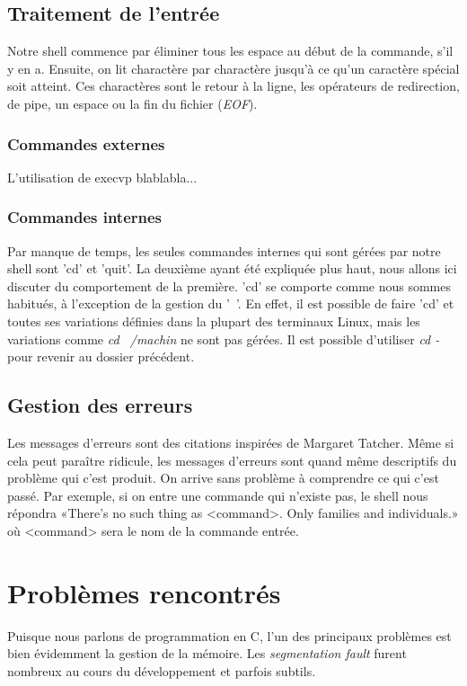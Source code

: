 \documentclass[letterpaper,12pt]{scrartcl}
\begin{document}
		\subsection{Traitement de l'entrée}
			Notre shell commence par éliminer tous les espace au début de la commande, s'il y en a. Ensuite, on lit charactère par charactère jusqu'à ce qu'un caractère spécial soit atteint. Ces charactères sont le retour à la ligne, les opérateurs de redirection, de pipe, un espace ou la fin du fichier (\textit{EOF}).
			
			\subsubsection{Commandes externes}
			L'utilisation de execvp blablabla...
			\subsubsection{Commandes internes}
				Par manque de temps, les seules commandes internes qui sont gérées par notre shell sont 'cd' et 'quit'. La deuxième ayant été expliquée plus haut, nous allons ici discuter du comportement de la première. 'cd' se comporte comme nous sommes habitués, à l'exception de la gestion du '~'. En effet, il est possible de faire 'cd' et toutes ses variations définies dans la plupart des terminaux Linux, mais les variations comme \textit{cd ~/machin} ne sont pas gérées. Il est possible d'utiliser \textit{cd -} pour revenir au dossier précédent.
		\subsection{Gestion des erreurs}
			Les messages d'erreurs sont des citations inspirées de Margaret Tatcher. Même si cela peut paraître ridicule, les messages
		d'erreurs sont quand même descriptifs du problème qui c'est produit. On arrive sans problème à comprendre ce qui c'est passé. Par exemple, si on entre une commande qui n'existe pas, le shell nous répondra «There's no such thing as <command>. Only families and individuals.» où <command> sera le nom de la commande entrée.
	\section{Problèmes rencontrés}
		Puisque nous parlons de programmation en C, l'un des principaux problèmes est bien évidemment la gestion de la mémoire. Les \textit{segmentation fault} furent nombreux au cours du développement et parfois subtils.
\end{document}
